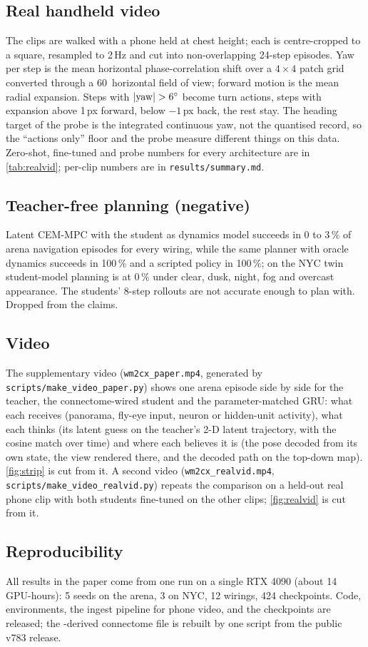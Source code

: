 \subsection{Real handheld video}
\label{sec:suppl-realvid}
The clips are walked with a phone held at chest height; each is centre-cropped to a square, resampled to 2\,Hz and cut
into non-overlapping 24-step episodes. Yaw per step is the mean horizontal phase-correlation shift over a $4\times4$
patch grid converted through a 60\degree\ horizontal field of view; forward motion is the mean radial expansion. Steps
with $|{\rm yaw}| > 6^\circ$ become turn actions, steps with expansion above 1\,px forward, below $-1$\,px back, the
rest stay. The heading target of the probe is the integrated continuous yaw, not the quantised record, so the
``actions only'' floor and the probe measure different things on this data. Zero-shot, fine-tuned and probe numbers for
every architecture are in \cref{tab:realvid}; per-clip numbers are in \texttt{results/summary.md}.

\subsection{Teacher-free planning (negative)}
Latent CEM-MPC with the student as dynamics model succeeds in 0 to 3\,\% of arena navigation episodes for every
wiring, while the same planner with oracle dynamics succeeds in 100\,\% and a scripted policy in 100\,\%; on the NYC
twin student-model planning is at 0\,\% under clear, dusk, night, fog and overcast appearance. The students' 8-step
rollouts are not accurate enough to plan with. Dropped from the claims.

\subsection{Video}
The supplementary video (\texttt{wm2cx\_paper.mp4}, generated by \texttt{scripts/make\_video\_paper.py}) shows one
arena episode side by side for the \vjepa teacher, the connectome-wired student and the parameter-matched GRU: what each
receives (panorama, fly-eye input, neuron or hidden-unit activity), what each thinks (its latent guess on the teacher's
2-D latent trajectory, with the cosine match over time) and where each believes it is (the pose decoded from its own
state, the view rendered there, and the decoded path on the top-down map). \cref{fig:strip} is cut from it. A second
video (\texttt{wm2cx\_realvid.mp4}, \texttt{scripts/make\_video\_realvid.py}) repeats the comparison on a held-out real
phone clip with both students fine-tuned on the other clips; \cref{fig:realvid} is cut from it.

\subsection{Reproducibility}
All results in the paper come from one run on a single RTX 4090 (about 14 GPU-hours): 5 seeds on the arena, 3 on NYC,
12 wirings, 424 checkpoints. Code, environments, the ingest pipeline for phone video, and the checkpoints are released;
the \flywire-derived connectome file is rebuilt by one script from the public v783 release.
